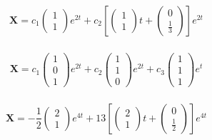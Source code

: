 \documentclass{article}
\begin{document}
\setcounter{subsubsection}{22}
\subsubsection{}

\[\mathbf{X} = c_1 \begin{pmatrix}
    1 \\
    1
  \end{pmatrix} e^{2 t} + c_2 \left[ \begin{pmatrix}
      1 \\
      1
    \end{pmatrix} t + \begin{pmatrix}
      0 \\
      \frac{1}{3}
    \end{pmatrix} \right] e^{2 t}\]

\setcounter{subsubsection}{24}
\subsubsection{}

\[\mathbf{X} = c_1 \begin{pmatrix}
    1 \\
    0 \\
    1
  \end{pmatrix} e^{2 t} + c_2 \begin{pmatrix}
    1 \\
    1 \\
    0
  \end{pmatrix} e^{2 t} + c_3 \begin{pmatrix}
    1 \\
    1 \\
    1
  \end{pmatrix} e^t\]

\setcounter{subsubsection}{30}
\subsubsection{}

\[\mathbf{X} = -\frac{1}{2} \begin{pmatrix}
    2 \\
    1
  \end{pmatrix} e^{4 t} + 13 \left[ \begin{pmatrix}
      2 \\
      1
    \end{pmatrix} t + \begin{pmatrix}
      0 \\
      \frac{1}{2}
    \end{pmatrix} \right] e^{4 t}\]
\end{document}
